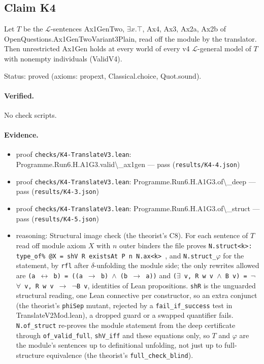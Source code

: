 \documentclass{article}
\begin{document}
\subsection*{Claim K4}

Let $T$ be the $\mathcal L$-sentences Ax1GenTwo, $\exists x.\top$, Ax4, Ax3, Ax2a, Ax2b of OpenQuestions.Ax1GenTwoVariant3Plain, read off the module by the translator. Then unrestricted Ax1Gen holds at every world of every v4 $\mathcal L$-general model of $T$ with nonempty individuals (ValidV4).

Status: proved (axioms: propext, Classical.choice, Quot.sound).

\paragraph{Verified.}
No check scripts.

\paragraph{Evidence.}
\begin{itemize}
\item proof \texttt{checks/K4-TranslateV3.lean}: Programme.Run6.H.A1G3.valid\textbackslash{}\_ax1gen --- pass (\texttt{results/K4-4.json})
\item proof \texttt{checks/K4-TranslateV3.lean}: Programme.Run6.H.A1G3.of\textbackslash{}\_deep --- pass (\texttt{results/K4-3.json})
\item proof \texttt{checks/K4-TranslateV3.lean}: Programme.Run6.H.A1G3.of\textbackslash{}\_struct --- pass (\texttt{results/K4-5.json})
\item reasoning: Structural image check (the theorist's C8). For each sentence of $T$ read off module axiom $X$ with $n$ outer binders the file proves \texttt{N.struct\textless{}k\textgreater{}: type\_of\% @X = shV R existsAt P n N.ax\textless{}k\textgreater{} }, and \texttt{N.struct\_$\varphi$} for the statement, by \texttt{rfl} after $\delta$-unfolding the module side; the only rewrites allowed are \texttt{(a $\leftrightarrow$ b) = ((a $\to$ b) $\wedge$ (b $\to$ a))} and \texttt{($\exists$ v, R w v $\wedge$ B v) = $\neg$$\forall$ v, R w v $\to$ $\neg$B v}, identities of Lean propositions. \texttt{shR} is the unguarded structural reading, one Lean connective per constructor, so an extra conjunct (the theorist's \texttt{phiSep} mutant, rejected by a \texttt{fail\_if\_success} test in TranslateV2Mod.lean), a dropped guard or a swapped quantifier fails. \texttt{N.of\_struct} re-proves the module statement from the deep certificate through \texttt{of\_valid\_full}, \texttt{shV\_iff} and these equations only, so $T$ and $\varphi$ are the module's sentences up to definitional unfolding, not just up to full-structure equivalence (the theorist's \texttt{full\_check\_blind}).
\end{itemize}
\end{document}
